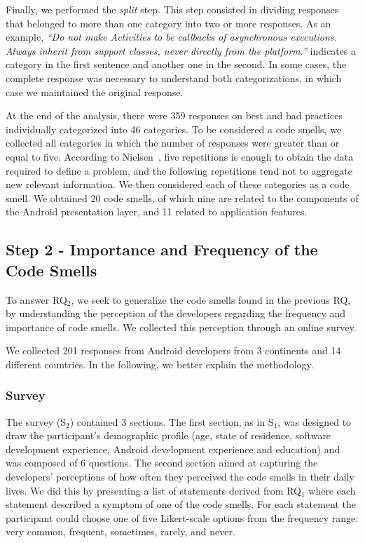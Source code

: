 Finally, we performed the \textit {split} step. This step consisted in dividing responses that belonged to more than one category into two or more responses.
As an example, \textit{``Do not make Activities to be callbacks of asynchronous executions. Always inherit from support classes, never directly from the platform.''} indicates a category in the first sentence and another one in the second. In some cases, the complete response was necessary to understand both categorizations, in which case we maintained the original response.

At the end of the analysis, there were 359 responses on best and bad practices individually categorized into 46 categories. 
To be considered a code smells, we collected all categories in which the number
of responses were greater than or equal to five.
According to Nielsen~\cite{NielsenMagicNumber:00}, five repetitions is enough to obtain the data required to define a problem, and the following repetitions tend not to aggregate new relevant information. We then considered each of these categories as a code smell.
We obtained 20 code smells, of which nine are related to the components of the Android presentation layer, and 11 related to application features.

\subsection{Step 2 - Importance and Frequency of the Code Smells}

To answer RQ$_2$, we seek to generalize the code smells 
found in the previous RQ, by understanding the perception of the developers regarding the frequency and importance of code smells. We collected this perception through an online survey.

We collected 201 responses from Android developers from 3 continents and 14 different countries. In the following, we better explain the methodology.

\subsubsection{Survey}
\label{etapa-2-questionario}

The survey (S$_2$) contained 3 sections. 
The first section, as in S$_1$, was designed to draw the participant's demographic profile 
(age, state of residence, software development experience, Android development experience and education) and was composed of 6 questions.
The second section aimed at capturing the developers' perceptions of how often they perceived the code smells in their daily lives. We did this by presenting a list of statements derived from RQ$_1$ where each statement described a symptom of one of the code smells. For each statement the participant could choose one of five Likert-scale options from the frequency range: very common, frequent, sometimes, rarely, and never.


